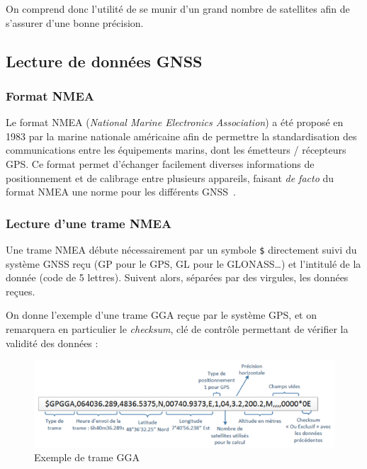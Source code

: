          On comprend donc l'utilité de se munir d'un grand nombre de satellites afin de s'assurer d'une bonne précision.

   \subsection{Lecture de données GNSS}\label{subsec:lecture-de-donnees-gnss-format-nmea}
      \subsubsection{Format NMEA}
         Le format NMEA (\textit{National Marine Electronics Association}) a été proposé en 1983 par la marine nationale américaine afin de permettre la standardisation des communications entre les équipements marins, dont les émetteurs / récepteurs GPS\@.
         Ce format permet d'échanger facilement diverses informations de positionnement et de calibrage entre plusieurs appareils, faisant \textit{de facto} du format NMEA une norme pour les différents GNSS~\cite{hofmann-wellenhofGNSSGlobalNavigation2007}.

      \subsubsection{Lecture d'une trame NMEA}
         Une trame NMEA débute nécessairement par un symbole \texttt{\$} directement suivi du système GNSS reçu (GP pour le GPS, GL pour le GLONASS\dots) et l'intitulé de la donnée (code de 5 lettres).
         Suivent alors, séparées par des virgules, les données reçues.

         On donne l'exemple d'une trame GGA reçue par le système GPS, et on remarquera en particulier le \textit{checksum}, clé de contrôle permettant de vérifier la validité des données :

         \begin{figure}[h]
             \centering
             \includegraphics[width=.95\textwidth]{imgs/trame-gga}
             \caption{Exemple de trame GGA}
             \label{fig:trame-gga}
         \end{figure}

